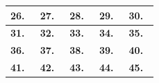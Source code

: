\begin{center}
\begin{tabular}{|p{2.7cm}|p{2.7cm}|p{2.7cm}|p{2.7cm}|p{2.7cm}|}
\hline
\textbf{26.}\ \underline{\hspace{1.3cm}} & \textbf{27.}\ \underline{\hspace{1.3cm}} & \textbf{28.}\ \underline{\hspace{1.3cm}} & \textbf{29.}\ \underline{\hspace{1.3cm}} & \textbf{30.}\ \underline{\hspace{1.3cm}} \\
\hline
\textbf{31.}\ \underline{\hspace{1.3cm}} & \textbf{32.}\ \underline{\hspace{1.3cm}} & \textbf{33.}\ \underline{\hspace{1.3cm}} & \textbf{34.}\ \underline{\hspace{1.3cm}} & \textbf{35.}\ \underline{\hspace{1.3cm}} \\
\hline
\textbf{36.}\ \underline{\hspace{1.3cm}} & \textbf{37.}\ \underline{\hspace{1.3cm}} & \textbf{38.}\ \underline{\hspace{1.3cm}} & \textbf{39.}\ \underline{\hspace{1.3cm}} & \textbf{40.}\ \underline{\hspace{1.3cm}} \\
\hline
\textbf{41.}\ \underline{\hspace{1.3cm}} & \textbf{42.}\ \underline{\hspace{1.3cm}} & \textbf{43.}\ \underline{\hspace{1.3cm}} & \textbf{44.}\ \underline{\hspace{1.3cm}} & \textbf{45.}\ \underline{\hspace{1.3cm}} \\
\hline
\end{tabular}
\end{center}

